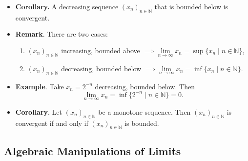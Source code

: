 \documentclass{article}
\newcommand{\N}{\mathbb{N}}
\newcommand{\seq}[2]{(#1_{#2})_{#2 \in \N}}
\newcommand{\set}[2]{\{ #1 \mid #2 \}}
\newcommand{\?}{\stackrel{?}{=}}
\begin{document}
\begin{itemize}
\begin{proof}
\begin{align*}
            |x_n - x| &= x - x_n \\
            &\leq x - x_{n_\varepsilon} \leq \varepsilon
        \end{align*}
        with $x_{n_\varepsilon} \leq x_n$ and $n \geq n_\varepsilon$ ($\seq{x}{n}$ increasing) and for all $\varepsilon > 0$, take $N(\varepsilon) = n_\varepsilon$.
    \end{proof}
    \item \textbf{Corollary.} A decreasing sequence $\seq{x}{n}$ that is bounded below is convergent.
    \item \textbf{Remark}. There are two cases:
    \begin{enumerate}[label=(\roman*)]
        \item $\seq{x}{n}$ increasing, bounded above $\implies \lim\limits_{n \to \infty} x_n = \sup \set{x_n}{n \in \N}$,
        \item $\seq{x}{n}$ decreasing, bounded below $\implies \lim\limits_{n \to \infty} x_n = \inf \set{x_n}{n \in \N}$.
    \end{enumerate}
    \item \textbf{Example}. Take $x_n = 2^{-n}$ decreasing, bounded below. Then
    $$\lim\limits_{n \to \infty} x_n = \inf\set{2^{-n}}{ n \in \N} = 0.$$
    \item \textbf{Corollary}. Let $\seq{x}{n}$ be a monotone sequence. Then $\seq{x}{n}$ is convergent if and only if $\seq{x}{n}$ is bounded.
\end{itemize}

\subsection*{Algebraic Manipulations of Limits}
\end{document}
